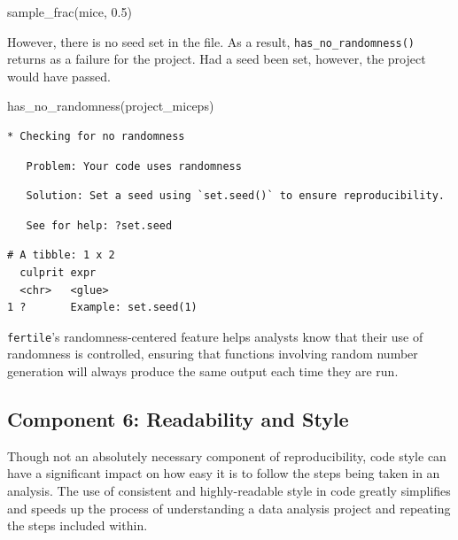 \documentclass[12pt,twoside]{reedthesis}
\newenvironment{Shaded}{\begin{snugshade}}{\end{snugshade}}
\newcommand{\FloatTok}[1]{\textcolor[rgb]{0.00,0.00,0.81}{#1}}
\newcommand{\FunctionTok}[1]{\textcolor[rgb]{0.00,0.00,0.00}{#1}}
\newcommand{\NormalTok}[1]{#1}
\newcommand{\StringTok}[1]{\textcolor[rgb]{0.31,0.60,0.02}{#1}}
\begin{document}
\begin{Shaded}
\begin{Highlighting}[]
\FunctionTok{sample\_frac}\NormalTok{(mice, }\FloatTok{0.5}\NormalTok{)}
\end{Highlighting}
\end{Shaded}
However, there is no seed set in the file. As a result, \texttt{has\_no\_randomness()} returns as a failure for the project. Had a seed been set, however, the project would have passed.
\begin{Shaded}
\begin{Highlighting}[]
\FunctionTok{has\_no\_randomness}\NormalTok{(}\StringTok{\textquotesingle{}project\_miceps\textquotesingle{}}\NormalTok{)}
\end{Highlighting}
\end{Shaded}
\begin{verbatim}
* Checking for no randomness
\end{verbatim}
\begin{verbatim}
   Problem: Your code uses randomness
\end{verbatim}
\begin{verbatim}
   Solution: Set a seed using `set.seed()` to ensure reproducibility.
\end{verbatim}
\begin{verbatim}
   See for help: ?set.seed
\end{verbatim}
\begin{verbatim}
# A tibble: 1 x 2
  culprit expr                
  <chr>   <glue>              
1 ?       Example: set.seed(1)
\end{verbatim}
\texttt{fertile}'s randomness-centered feature helps analysts know that their use of randomness is controlled, ensuring that functions involving random number generation will always produce the same output each time they are run.

\hypertarget{component-6-readability-and-style}{%
\subsection{Component 6: Readability and Style}\label{component-6-readability-and-style}}

Though not an absolutely necessary component of reproducibility, code style can have a significant impact on how easy it is to follow the steps being taken in an analysis. The use of consistent and highly-readable style in code greatly simplifies and speeds up the process of understanding a data analysis project and repeating the steps included within.
\end{document}
